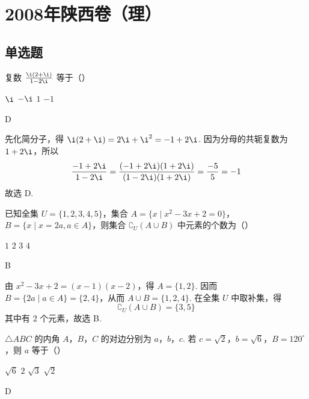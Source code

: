 \chapter{2008年陕西卷（理）}

\section{单选题}

\begin{problem}
复数 \(\frac{\i(2 + \i)}{1 - 2\i}\) 等于（\quad）

\choices
    {\(\i\)}
    {\(-\i\)}
    {\(1\)}
    {\(-1\)}
\end{problem}

\begin{answer}
D
\end{answer}

\begin{solution}
先化简分子，得 \(\i(2+\i)=2\i+\i^2=-1+2\i\). 因为分母的共轭复数为 \(1+2\i\)，所以
\[
\frac{-1+2\i}{1-2\i}=\frac{(-1+2\i)(1+2\i)}{(1-2\i)(1+2\i)}=\frac{-5}{5}=-1
\]
故选 D.
\end{solution}

\begin{problem}
已知全集 \(U = \{1, 2, 3, 4, 5\}\)，集合 \(A = \{x \mid x^2 - 3x + 2 = 0\}\)，\(B = \{x \mid x = 2a, a \in A\}\)，则集合 \(\complement_U(A \cup B)\) 中元素的个数为（\quad）

\choices
    {\(1\)}
    {\(2\)}
    {\(3\)}
    {\(4\)}
\end{problem}

\begin{answer}
B
\end{answer}

\begin{solution}
由 \(x^2-3x+2=(x-1)(x-2)\)，得 \(A=\{1,2\}\). 因而
\(B=\{2a\mid a\in A\}=\{2,4\}\)，从而 \(A\cup B=\{1,2,4\}\). 在全集 \(U\) 中取补集，得
\[
\complement_U(A\cup B)=\{3,5\}
\]
其中有 \(2\) 个元素，故选 B.
\end{solution}

\begin{problem}
\(\triangle ABC\) 的内角 \(A\)，\(B\)，\(C\) 的对边分别为 \(a\)，\(b\)，\(c\). 若 \(c = \sqrt{2}\)，\(b = \sqrt{6}\)，\(B = 120^{\circ}\)，则 \(a\) 等于（\quad）

\choices
    {\(\sqrt{6}\)}
    {\(2\)}
    {\(\sqrt{3}\)}
    {\(\sqrt{2}\)}
\end{problem}

\begin{answer}
D
\end{answer}

